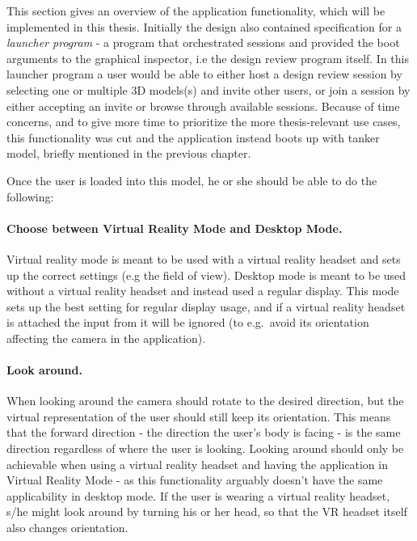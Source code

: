 
This section gives an overview of the application functionality, which will be implemented in this thesis.
Initially the design also contained specification for a \textit{launcher program} - a program that orchestrated sessions and provided the boot arguments to the graphical inspector, 
i.e the design review program itself.
In this launcher program a user would be able to either host a design review session by selecting one or multiple 3D models(s) and invite other users, or
join a session by either accepting an invite or browse through available sessions. Because of time concerns, and to give more time to prioritize the 
more thesis-relevant use cases, this functionality was cut and the application instead boots up with tanker model, briefly mentioned in the previous chapter. 

Once the user is loaded into this model, he or she should be able to do the following:

\paragraph{Choose between Virtual Reality Mode and Desktop Mode.} Virtual reality mode is meant to be used with a virtual reality headset
and sets up the correct settings (e.g the field of view). Desktop mode is meant to be used without a virtual reality headset and instead used
a regular display. This mode sets up the best setting for regular display usage, and if a virtual reality headset is attached the input from it will be ignored 
(to e.g.~avoid its orientation affecting the camera in the application).

\paragraph{Look around.} When looking around the camera should rotate to the desired direction, but the virtual representation of the user should still keep its orientation. 
This means that the forward direction - the direction the user's body is facing - is the same direction regardless of where the user is looking. 
Looking around should only be achievable when using a virtual reality
headset and having the application in Virtual Reality Mode - as this functionality arguably doesn't have the same applicability in desktop mode. 
If the user is wearing a virtual reality headset, s/he might look around by turning his or her head, so that the VR headset itself also changes orientation.

